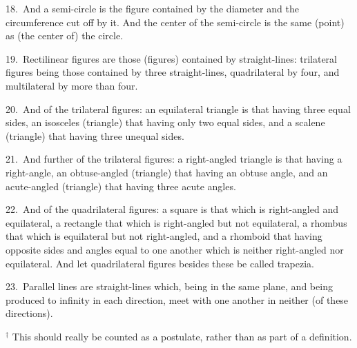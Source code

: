 \begin{Parallel}{}{}
{18.~And a semi-circle is the figure contained by the diameter  and
the circumference  cut off by it. And the center of the semi-circle is the same (point)
as (the center of) the circle.

19.~Rectilinear figures are those (figures) contained by straight-lines: trilateral
figures being those contained by three straight-lines,  quadrilateral   by four,
and multilateral by more than four.

20.~And of the trilateral figures: an equilateral triangle is that having
three equal sides, an isosceles (triangle) that having only two equal sides,
and a scalene (triangle) that having three unequal sides.

21.~And further of the trilateral figures: a right-angled triangle is that having
a right-angle, an obtuse-angled  (triangle) that having an obtuse
angle, and an acute-angled (triangle) that having three acute angles.

22.~And of the quadrilateral figures: a square is that which is right-angled
and equilateral, a rectangle that which is right-angled but not equilateral,
a rhombus that which is equilateral but not right-angled, and a rhomboid that
having opposite sides and angles equal to one another which is neither
right-angled nor equilateral. And let quadrilateral figures besides these be called
trapezia.

23.~Parallel lines are straight-lines which, being in the same plane, and
being produced to infinity in each direction, meet with one another in
neither (of these directions).}
\end{Parallel}
{\footnotesize 
\noindent $^\dag$ This should really be counted as a postulate, rather than as part of a definition.}

